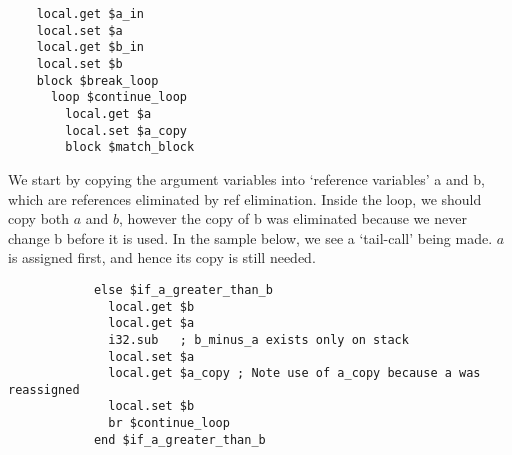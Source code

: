 \begin{verbatim}
    local.get $a_in
    local.set $a
    local.get $b_in
    local.set $b
    block $break_loop
      loop $continue_loop
        local.get $a
        local.set $a_copy
        block $match_block
\end{verbatim}
We start by copying the argument variables into `reference variables' a and b, which are references eliminated by ref elimination. Inside the loop, we should copy both $a$ and $b$, however the copy of b was eliminated because we never change b before it is used. In the sample below, we see a `tail-call' being made. $a$ is assigned first, and hence its copy is still needed.
\begin{verbatim}
            else $if_a_greater_than_b
              local.get $b
              local.get $a
              i32.sub   ; b_minus_a exists only on stack
              local.set $a
              local.get $a_copy ; Note use of a_copy because a was reassigned
              local.set $b
              br $continue_loop
            end $if_a_greater_than_b
\end{verbatim}